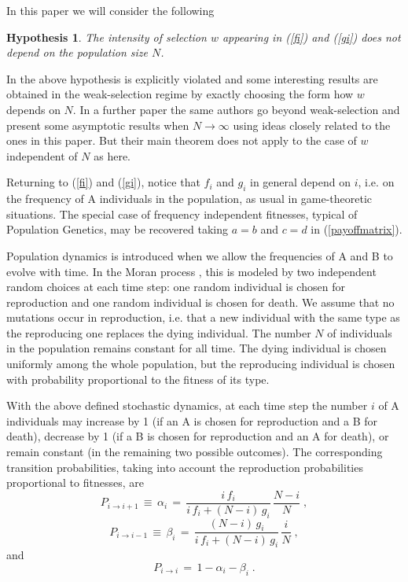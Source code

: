 \documentclass[12pt]{article}
\newtheorem{hypothesis}{Hypothesis}
\begin{document}
In this paper we will consider the following
\begin{hypothesis}  \label{intensityhypothesis}
	The intensity of selection $w$ appearing in (\ref{fi}) and (\ref{gi}) does not depend on the population size $N$.
\end{hypothesis}
In \cite{ChalubSouza2009}  the above hypothesis is explicitly violated and some interesting results are obtained in the weak-selection regime by exactly choosing the form how $w$ depends on $N$. In a further paper \cite{ChalubSouza2016} the same authors go beyond weak-selection and present some asymptotic results when $N \rightarrow \infty$ using ideas closely related to the ones in this paper. But their main theorem does not apply to the case of $w$ independent of $N$ as here.

Returning to (\ref{fi}) and (\ref{gi}), notice that $f_i$ and $g_i$ in general depend on $i$, i.e. on the frequency of A individuals in the population, as usual in game-theoretic situations. The special case of frequency independent fitnesses, typical of Population Genetics, may be recovered taking  $a=b$ and $c=d$ in (\ref{payoffmatrix}).

Population dynamics is introduced when we allow the frequencies of A and B to evolve with time. In the Moran process \cite{moran}, this is modeled by two independent random choices at each time step: one random individual is chosen for reproduction and one random individual is chosen for death. We assume that no mutations occur in reproduction, i.e. that a new individual with the same type as the reproducing one replaces the dying individual. The number $N$ of individuals in the population remains constant for all time. The dying individual is chosen uniformly among the whole population, but the reproducing individual is chosen with probability proportional to the fitness of its type. 

With the above defined stochastic dynamics, at each time step the number $i$ of A individuals may increase by 1 (if an A is chosen for reproduction and a B for death), decrease by 1 (if a B is chosen for reproduction and an A for death), or remain constant (in the remaining two possible outcomes). The corresponding transition probabilities, taking into account the reproduction probabilities proportional to fitnesses, are
\begin{equation}  \label{alphai}
P_{i \rightarrow i+1} \, \equiv \, \alpha_i \, =\, \frac{i \, f_i}{i \, f_i+ (N-i) \, g_i} \, \frac{N-i}{N} \;,
\end{equation}
\begin{equation}  \label{betai}
P_{i \rightarrow i-1}\, \equiv \, \beta_i \,=\, \frac{(N-i) \, g_i}{i \, f_i+ (N-i) \, g_i} \, \frac{i}{N} \;,
\end{equation}
and 
\[P_{i \rightarrow i} \,=\, 1- \alpha_i - \beta_i\;.\]
\end{document}
